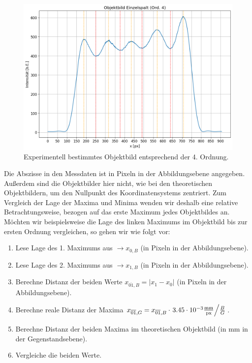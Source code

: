 \begin{figure}[H]
  \centering
  \includegraphics[width=.9\textwidth]{files/plots/4/es_praxis_objektbild_ord4.png}
  \caption{Experimentell bestimmtes Objektbild entsprechend der 4. Ordnung.}
  \label{fig:es_praxis_objektbild_ord4}
\end{figure}


Die Abszisse in den Messdaten ist in Pixeln in der Abbildungsebene angegeben. Außerdem sind die Objektbilder hier nicht, wie bei den theoretischen Objektbildern, um den Nullpunkt des Koordinatensystems zentriert. Zum Vergleich der Lage der Maxima und Minima wenden wir deshalb eine relative Betrachtungsweise, bezogen auf das erste Maximum jedes Objektbildes an. Möchten wir beispielsweise die Lage des linken Maximums im Objektbild bis zur ersten Ordnung vergleichen, so gehen wir wie folgt vor:
\begin{enumerate}[label=\arabic*.)]
  \item Lese Lage des 1. Maximums aus $\to x_{0, B}$ (in Pixeln in der Abbildungsebene).
  \item Lese Lage des 2. Maximums aus $\to x_{1, B}$ (in Pixeln in der Abbildungsebene).
  \item Berechne Distanz der beiden Werte $x_{\overline{01}, B} = |x_{1} - x_{0}|$ (in Pixeln in der Abbildungsebene).
  \item Berechne reale Distanz der Maxima $x_{\overline{01}, G} = x_{\overline{01}, B} \cdot \ffrac{3.45 \cdot 10^{-3} \frac{\si{\milli\meter}}{\mathrm{px}}}{\frac{B}{G}}$.
  \item Berechne Distanz der beiden Maxima im theoretischen Objektbild (in $\si{\milli\meter}$ in der Gegenstandsebene).
  \item Vergleiche die beiden Werte.
\end{enumerate} 

